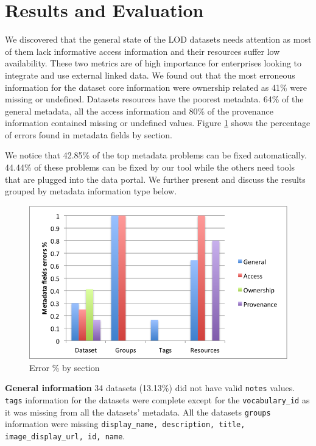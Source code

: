 \documentclass{../../Tools/LaTEX/sig-alternate}
\begin{document}

\section{Results and Evaluation}

We discovered that the general state of the LOD datasets needs attention as most of them lack informative access information and their resources suffer low availability. These two metrics are of high importance for enterprises looking to integrate and use external linked data. We found out that the most erroneous information for the dataset core information were ownership related as 41\% were missing or undefined. Datasets resources have the poorest metadata. 64\% of the general metadata, all the access information and 80\% of the provenance information contained missing or undefined values. Figure \ref{fig:metadata_noise_by_section} shows the percentage of errors found in metadata fields by section.

We notice that 42.85\% of the top metadata problems can be fixed automatically. 44.44\% of these problems can be fixed by our tool while the others need tools that are plugged into the data portal. We further present and discuss the results grouped by metadata information type below.

\begin{figure}[!hpt]
\centering
\includegraphics[width=.8\linewidth]{metadata_noise_by_section.png}
\caption{Error \% by section}
\label{fig:metadata_noise_by_section}
\end{figure}

\textbf{General information} 34 datasets (13.13\%) did not have valid \texttt{notes} values. \texttt{tags} information for the datasets were complete except for the \texttt{vocabulary\_id} as it was missing from all the datasets' metadata. All the datasets \texttt{groups} information were missing \texttt{display\_name, description, title, image\_display\_url, id, name}.
\end{document}
